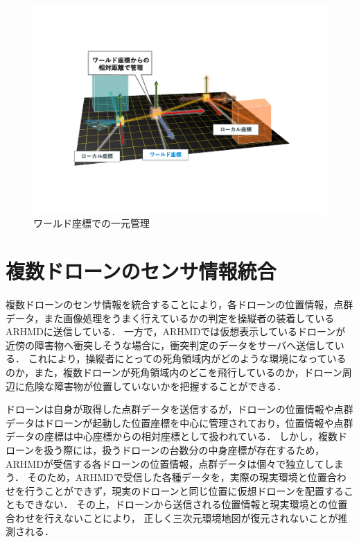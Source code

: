 \documentclass[a4paper,11pt]{ujreport}
\begin{document}
\begin{figure}[bt]
  \centering
  \includegraphics[width=0.9\linewidth]{img/03_cordinate.pdf}
  \caption{ワールド座標での一元管理}
  \label{fig:03_cordinate}
\end{figure}

\section{複数ドローンのセンサ情報統合}
\label{sec:SensorIntegration}

複数ドローンのセンサ情報を統合することにより，各ドローンの位置情報，点群データ，また画像処理をうまく行えているかの判定を操縦者の装着しているARHMDに送信している．
一方で，ARHMDでは仮想表示しているドローンが近傍の障害物へ衝突しそうな場合に，衝突判定のデータをサーバへ送信している．
これにより，操縦者にとっての死角領域内がどのような環境になっているのか，また，複数ドローンが死角領域内のどこを飛行しているのか，ドローン周辺に危険な障害物が位置していないかを把握することができる．

ドローンは自身が取得した点群データを送信するが，ドローンの位置情報や点群データはドローンが起動した位置座標を中心に管理されており，位置情報や点群データの座標は中心座標からの相対座標として扱われている．
しかし，複数ドローンを扱う際には，扱うドローンの台数分の中身座標が存在するため，ARHMDが受信する各ドローンの位置情報，点群データは個々で独立してしまう．
そのため，ARHMDで受信した各種データを，実際の現実環境と位置合わせを行うことができず，現実のドローンと同じ位置に仮想ドローンを配置することもできない．
その上，ドローンから送信される位置情報と現実環境との位置合わせを行えないことにより，
正しく三次元環境地図が復元されないことが推測される．
\end{document}
